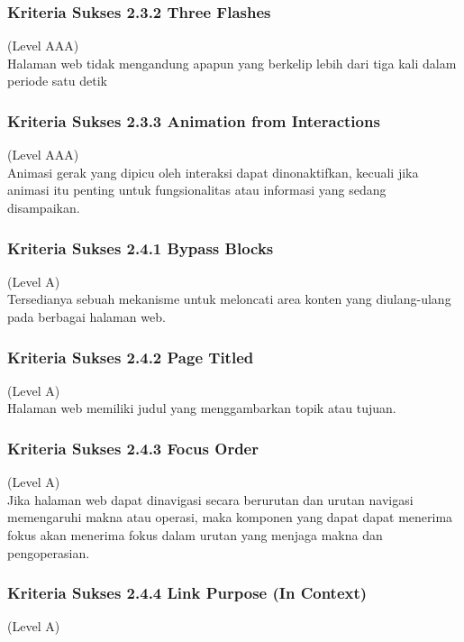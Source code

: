 \subsubsection{Kriteria Sukses 2.3.2 Three Flashes}
\label{subsubsec:kriteria_2.3.2}
(Level AAA) \\

Halaman web tidak mengandung apapun yang berkelip lebih dari tiga kali dalam periode satu detik


\subsubsection{Kriteria Sukses 2.3.3 Animation from Interactions}
\label{subsubsec:kriteria_2.3.3}
(Level AAA) \\

Animasi gerak yang dipicu oleh interaksi dapat dinonaktifkan, kecuali jika animasi itu penting untuk fungsionalitas atau informasi yang sedang disampaikan.

\subsubsection{Kriteria Sukses 2.4.1 Bypass Blocks}
\label{subsubsec:kriteria_2.4.1}
(Level A) \\

Tersedianya sebuah mekanisme untuk meloncati area konten yang diulang-ulang pada berbagai halaman web.

\subsubsection{Kriteria Sukses 2.4.2 Page Titled}
\label{subsubsec:kriteria_2.4.2}
(Level A) \\

Halaman web memiliki judul yang menggambarkan topik atau tujuan.

\subsubsection{Kriteria Sukses 2.4.3 Focus Order}
\label{subsubsec:kriteria_2.4.3}
(Level A) \\

Jika halaman web dapat dinavigasi secara berurutan dan urutan navigasi memengaruhi makna atau operasi, maka komponen yang dapat dapat menerima fokus akan menerima fokus dalam urutan yang menjaga makna dan pengoperasian.

\subsubsection{Kriteria Sukses 2.4.4 Link Purpose (In Context)}
\label{subsubsec:kriteria_2.4.4}
(Level A) \\

